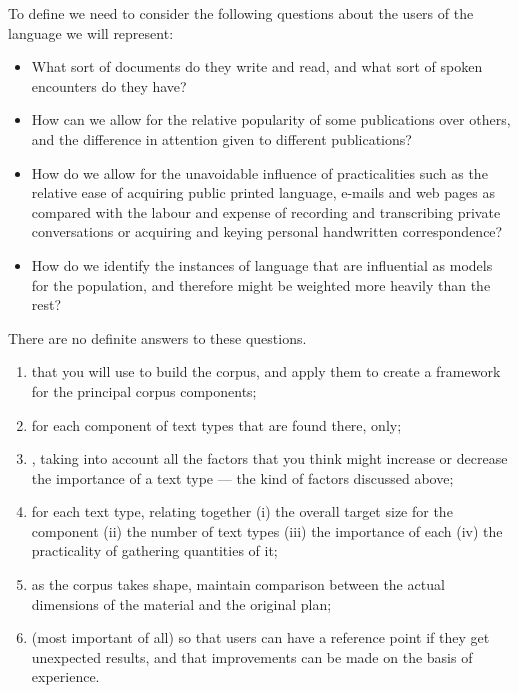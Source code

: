 \documentclass[a4paper,landscape,headrule,footrule,xetex]{foils}
\begin{document}

To define  we need to consider the following questions about the users of the language we will represent:

\begin{itemize}
\item  What sort of documents do they write and read, and what sort of spoken encounters do they have?
\item How can we allow for the relative popularity of some publications over others, and the difference in attention given to different publications?
\item How do we allow for the unavoidable influence of practicalities such as the relative ease of acquiring public printed language, e-mails and web pages as compared with the labour and expense of recording and transcribing private conversations or acquiring and keying personal handwritten correspondence?
\item How do we identify the instances of language that are influential as models for the population, and therefore might be weighted more heavily than the rest?
\end{itemize}

There are no definite answers to these questions.


\begin{enumerate}
\item {} that you will use to build the corpus, and apply them to create a framework for the principal corpus components;
\item for each component  of text types that are found there,  only;
\item {}, taking into account all the factors that you think might increase or decrease the importance of a text type — the kind of factors discussed above;
\item {} for each text type, relating together (i) the overall target size for the component (ii) the number of text types (iii) the importance of each (iv) the practicality of gathering quantities of it;
\item as the corpus takes shape, maintain comparison between the actual dimensions of the material and the original plan;
\item (most important of all)  so that users can have a reference point if they get unexpected results, and that improvements can be made on the basis of experience.
\end{enumerate}
\end{document}
